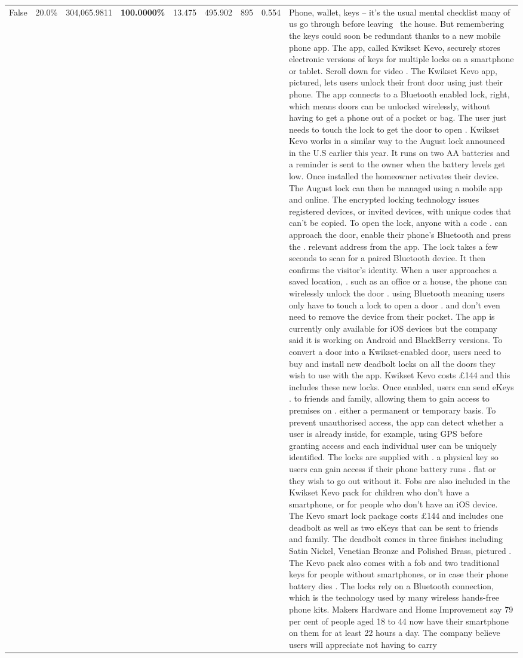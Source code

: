 \begin{table}[H]
\begin{tabular}{lllrlllll}
False & 20.0\% & \color{red} 304,065.9811 & \bfseries \color{red} 100.0000\% & 13.475 & 495.902 & 895 & 0.554 & Phone, wallet, keys – it’s the usual mental checklist many of us go through before leaving  the house. But remembering the keys could soon be redundant thanks to a new mobile phone app. The app, called Kwikset Kevo, securely stores electronic versions of keys for multiple locks on a smartphone or tablet. Scroll down for video . The Kwikset Kevo app, pictured, lets users unlock their front door using just their phone. The app connects to a Bluetooth enabled lock, right, which means doors can be unlocked wirelessly, without having to get a phone out of a pocket or bag. The user just needs to touch the lock to get the door to open . Kwikset Kevo works in a similar way to the August lock announced in the U.S earlier this year. It runs on two AA batteries and a reminder is sent to the owner when the battery levels get low. Once installed the homeowner activates their device. The August lock can then be managed using a mobile app and online. The encrypted locking technology issues registered devices, or invited devices, with unique codes that can't be copied. To open the lock, anyone with a code . can approach the door, enable their phone's Bluetooth and press the . relevant address from the app. The lock takes a few seconds to scan for a paired Bluetooth device. It then confirms the visitor's identity. When a user approaches a saved location, . such as an office or a house, the phone can wirelessly unlock the door . using Bluetooth meaning users only have to touch a lock to open a door . and don't even need to remove the device from their pocket. The app is currently only available for iOS devices but the company said it is working on Android and BlackBerry versions. To convert a door into a Kwikset-enabled door, users need to buy and install new deadbolt locks on all the doors they wish to use with the app. Kwikset Kevo costs £144 and this includes these new locks. Once enabled, users can send eKeys . to friends and family, allowing them to gain access to premises on . either a permanent or temporary basis. To prevent unauthorised access, the app can detect whether a user is already inside, for example, using GPS before granting access and each individual user can be uniquely identified. The locks are supplied with . a physical key so users can gain access if their phone battery runs . flat or they wish to go out without it. Fobs are also included in the Kwikset Kevo pack for children who don't have a smartphone, or for people who don't have an iOS device. The Kevo smart lock package costs £144 and includes one deadbolt as well as two eKeys that can be sent to friends and family. The deadbolt comes in three finishes including Satin Nickel, Venetian Bronze and Polished Brass, pictured . The Kevo pack also comes with a fob and two traditional keys for people without smartphones, or in case their phone battery dies . The locks rely on a Bluetooth connection, which is the technology used by many wireless hands-free phone kits. Makers Hardware and Home Improvement say 79 per cent of people aged 18 to 44 now have their smartphone on them for at least 22 hours a day. The company believe users will appreciate not having to carry 
\end{tabular}
\end{table}
